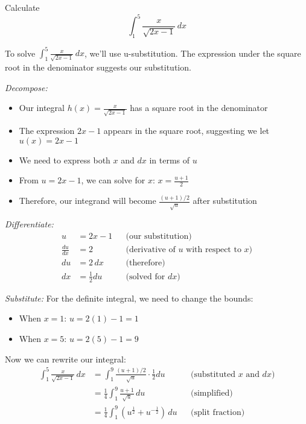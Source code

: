 \documentclass{article}
\begin{document}
  \begin{exercise}
    Calculate 
    \begin{equation}
      \int_1^5 \frac{x}{\sqrt{2x - 1}} \,dx
    \end{equation}
  \end{exercise}
  \begin{solution}
    To solve $\int_1^5 \frac{x}{\sqrt{2x - 1}} \,dx$, we'll use u-substitution. The expression under the square root in the denominator suggests our substitution.
    
    \textit{Decompose:}
    \begin{itemize}
      \item Our integral $h(x) = \frac{x}{\sqrt{2x - 1}}$ has a square root in the denominator
      \item The expression $2x - 1$ appears in the square root, suggesting we let $u(x) = 2x - 1$
      \item We need to express both $x$ and $dx$ in terms of $u$
      \item From $u = 2x - 1$, we can solve for $x$: $x = \frac{u+1}{2}$
      \item Therefore, our integrand will become $\frac{(u+1)/2}{\sqrt{u}}$ after substitution
    \end{itemize}

    \textit{Differentiate:}
    \begin{align*}
      u &= 2x - 1 && \text{(our substitution)} \\
      \frac{du}{dx} &= 2 && \text{(derivative of $u$ with respect to $x$)} \\
      du &= 2\,dx && \text{(therefore)} \\
      dx &= \frac{1}{2}du && \text{(solved for $dx$)}
    \end{align*}

    \textit{Substitute:}
    For the definite integral, we need to change the bounds:
    \begin{itemize}
      \item When $x = 1$: $u = 2(1) - 1 = 1$
      \item When $x = 5$: $u = 2(5) - 1 = 9$
    \end{itemize}
    
    Now we can rewrite our integral:
    \begin{align*}
      \int_1^5 \frac{x}{\sqrt{2x - 1}} \,dx &= \int_1^9 \frac{(u+1)/2}{\sqrt{u}} \cdot \frac{1}{2}du && \text{(substituted $x$ and $dx$)} \\
      &= \frac{1}{4}\int_1^9 \frac{u+1}{\sqrt{u}} \,du && \text{(simplified)} \\
      &= \frac{1}{4}\int_1^9 (u^{\frac{1}{2}} + u^{-\frac{1}{2}}) \,du && \text{(split fraction)}
    \end{align*}


\end{solution}
\end{document}
